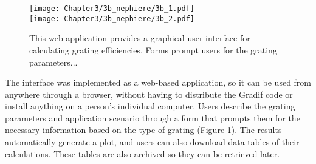 \begin{figure}[htbp] %
   \centering
   \texttt{[image: Chapter3/3b\_nephiere/3b\_1.pdf]} \\
   \texttt{[image: Chapter3/3b\_nephiere/3b\_2.pdf]}
   \caption{This web application provides a graphical user interface for calculating grating efficiencies. Forms prompt users for the grating parameters...}
   \label{3b}
\end{figure}

The interface was implemented as a web-based application, so it can be used from anywhere through a browser, without having to distribute the Gradif code or install anything on a person's individual computer.  Users describe the grating parameters and application scenario through a form that prompts them for the necessary information based on the type of grating (Figure \ref{3b}).  The results automatically generate a plot, and users can also download data tables of their calculations.  These tables are also archived so they can be retrieved later.

